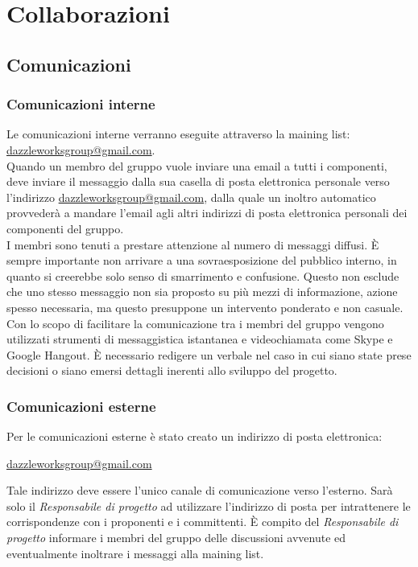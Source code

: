 \section{Collaborazioni}
	\subsection{Comunicazioni}
		\subsubsection{Comunicazioni interne}
Le comunicazioni interne verranno eseguite attraverso la \gls{maining list}: \url{dazzleworksgroup@gmail.com}. \\ 
Quando un membro del gruppo vuole inviare una email a tutti i componenti, deve inviare il messaggio dalla sua casella di posta elettronica personale verso l'indirizzo \url{dazzleworksgroup@gmail.com}, dalla quale un inoltro automatico provvederà a mandare l'email agli altri indirizzi di posta elettronica personali dei componenti del gruppo.\\ 
I membri sono tenuti a prestare attenzione al numero di messaggi diffusi. È sempre importante non arrivare a una sovraesposizione del pubblico interno, in quanto si creerebbe solo senso di smarrimento e confusione. Questo non esclude che uno stesso messaggio non sia proposto su più mezzi di informazione, azione spesso necessaria, ma questo presuppone un intervento ponderato e non casuale.\\
Con lo scopo di facilitare la comunicazione tra i membri del gruppo vengono utilizzati strumenti di messaggistica istantanea e videochiamata come Skype e Google Hangout.
È necessario redigere un \gls{verbale} nel caso in cui siano state prese decisioni o siano emersi dettagli inerenti allo sviluppo del progetto. 
		\subsubsection{Comunicazioni esterne}
Per le comunicazioni esterne è stato creato un indirizzo di posta elettronica:
\begin{center}
\url{dazzleworksgroup@gmail.com}
\end{center}
Tale indirizzo deve essere l'unico canale di comunicazione verso l'esterno. Sarà solo il \textit{Responsabile di progetto} ad utilizzare l'indirizzo di posta per intrattenere le corrispondenze con i proponenti e i committenti. È compito del \textit{Responsabile di progetto} informare i membri del gruppo delle discussioni avvenute ed eventualmente inoltrare i messaggi alla \gls{maining list}.


